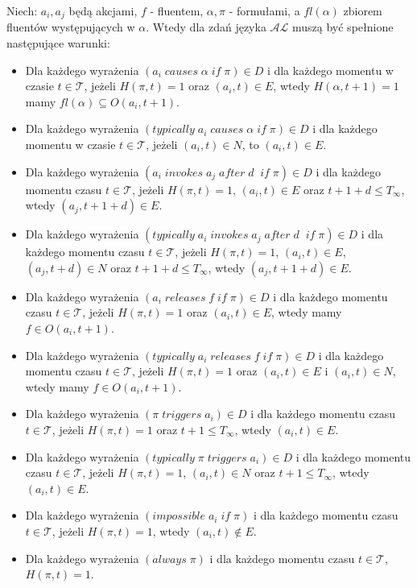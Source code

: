 Niech: $a_i,a_j$ będą akcjami, $ f $ - fluentem, $\alpha, \pi$ - formułami, a $fl(\alpha)$ zbiorem fluentów występujących w $\alpha$. Wtedy dla zdań języka $\mathcal{AL}$  muszą być spełnione następujące warunki: 
   \begin{itemize} 
   		\item Dla każdego wyrażenia $ ( a_i\;causes\;\alpha\;if\;\pi)\in D $ i dla każdego momentu w czasie $t \in \mathcal{T}$, jeżeli $H(\pi,t)=1$ oraz $(a_i,t) \in E$, wtedy $H(\alpha,t + 1)=1$ mamy $fl(\alpha)\subseteq O(a_i,t + 1)$.
		\item Dla każdego wyrażenia $ ( typically\; a_i\;causes\;\alpha\;if\;\pi)\in D $ i dla każdego momentu w czasie $t \in \mathcal{T}$, jeżeli $(a_i,t) \in N$, to $(a_i,t) \in E$.
 		\item Dla każdego wyrażenia $( a_i\;invokes\;a_j\;after\;d\;\;if\;\pi)\in D$ i dla każdego momentu czasu $t \in \mathcal{T}$, jeżeli $H(\pi,t)=1$, $(a_i,t)\in E $ oraz $t+1+d\leq T_{\infty}$, wtedy $(a_j,t+1+d) \in E $.
	 	\item Dla każdego wyrażenia $( typically\; a_i\;invokes\;a_j\;after\;d\;\;if\;\pi)\in D$ i dla każdego momentu czasu $t \in \mathcal{T}$, jeżeli $H(\pi,t)=1$, $(a_i,t)\in E$, $(a_j, t + d)\in N $ oraz $t+1+d\leq T_{\infty}$, wtedy $(a_j,t+1+d) \in E $.
   		\item Dla każdego wyrażenia $( a_i\;releases\;f\;if\;\pi)\in D $ i dla każdego momentu czasu $t \in \mathcal{T}$, jeżeli $H(\pi,t)=1$ oraz $(a_i,t)\in E$, wtedy mamy $f\in O(a_i,t+1)$.
 		\item Dla każdego wyrażenia $( typically\; a_i \;releases\;f\;if\;\pi)\in D $ i dla każdego momentu czasu $t \in \mathcal{T}$, jeżeli $H(\pi,t)=1$ oraz $(a_i,t)\in E$ i $(a_i,t)\in N$, wtedy mamy $f\in O(a_i,t+1)$.
   		\item Dla każdego wyrażenia $(\pi\;triggers\; a_i)\in D$ i dla każdego momentu czasu $t \in \mathcal{T}$, jeżeli $H(\pi,t)=1$ oraz $t+1\leq T_{\infty}$, wtedy $(a_i,t)\in E$.
		\item Dla każdego wyrażenia $(typically\; \pi\;triggers\; a_i)\in D$ i dla każdego momentu czasu $t \in \mathcal{T}$, jeżeli $H(\pi,t)=1$, $(a_i, t)\in N$ oraz $t+1\leq T_{\infty}$, wtedy $(a_i,t)\in E$.
		\item Dla każdego wyrażenia $(impossible \; a_i \; if\;  \pi )$ i dla każdego momentu czasu $t \in \mathcal{T}$, jeżeli $H(\pi,t)=1$, wtedy $(a_i,t) \notin E $.
		\item Dla każdego wyrażenia $(always \; \pi )$ i dla każdego momentu czasu $t \in \mathcal{T}$, $H(\pi,t)=1$.
   \end{itemize}
